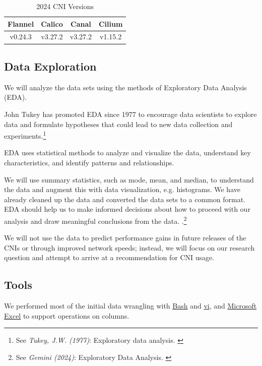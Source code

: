 \begin{table}[H]
\caption{2024 CNI Versions}
\begin{tabular}{|c | c | c | c |} 
 \hline
 Flannel & Calico & Canal & Cilium \\
 \hline
 v0.24.3 & v3.27.2 & v3.27.2 & v1.15.2 \\ 
 \hline
\end{tabular}
\label{tab:2024ver}
\end{table}

\subsection{Data Exploration}

We will analyze the data sets using the methods of Exploratory Data Analysis (EDA).

John Tukey has promoted EDA since 1977 to encourage data scientists to explore data and formulate hypotheses that could lead to new data collection and experiments.\footnote{See \textit{Tukey, J.W. (1977)}: Exploratory data analysis. \cite{exploratoryDA}}

EDA uses statistical methods to analyze and visualize the data, understand key characteristics, and identify patterns and relationships. 

We will use summary statistics, such as mode, mean, and median, to understand the data and augment this with data visualization, e.g. histograms. We have already cleaned up the data and converted the data sets to a common format. EDA should help us to make informed decisions about how to proceed with our analysis and draw meaningful conclusions from the data. .\footnote{See \textit{Gemini (2024)}: Exploratory Data Analysis. \cite{bardExploratory}}  

We will not use the data to predict performance gains in future releases of the CNIs or through improved network speeds; instead, we will focus on our research question and attempt to arrive at a recommendation for CNI usage.

\subsection{Tools}

We performed most of the initial data wrangling with \href{https://www.gnu.org/software/bash/}{Bash} and \href{https://pubs.opengroup.org/onlinepubs/9699919799/utilities/vi.html}{vi}, and \href{https://www.microsoft.com/en-us/microsoft-365/excel}{Microsoft Excel} to support operations on columns.

